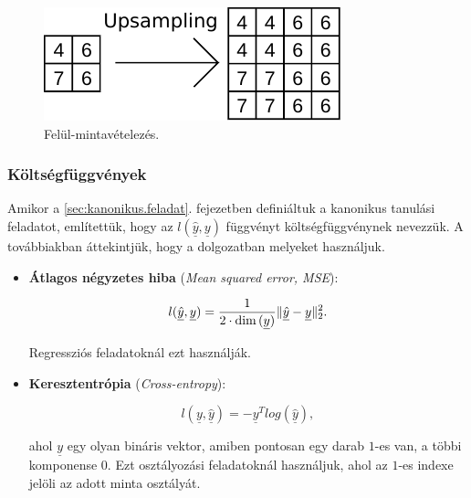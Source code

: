 \begin{figure} [h!]
	\centering
	\includegraphics[scale=1.2]{img/upsamping-pelda.pdf}
	\caption{Felül-mintavételezés.}
	\label{fig:upsampling-pelda}
\end{figure}




\subsubsection{Költségfüggvények}

Amikor a \ref{sec:kanonikus.feladat}. fejezetben definiáltuk a kanonikus tanulási feladatot, említettük, hogy az $ l(\underline{\hat{y}}, \underline{y}) $ függvényt költségfüggvénynek nevezzük. A továbbiakban áttekintjük, hogy a dolgozatban melyeket használjuk.

%

\begin{itemize}
	
	\item 
	\textbf{Átlagos négyzetes hiba} (\textit{Mean squared error, MSE}):
	
	
	\[  l(\underline{\hat{y}}, \underline{y}) = \frac{1}{2 \cdot \dim{(\underline{y})}} \lVert\underline{\hat{y}} - \underline{y}\rVert_2^2  . \]
	
	Regressziós feladatoknál ezt használják.

	
	\item 
	\textbf{Keresztentrópia} (\textit{Cross-entropy}):
	
	\[  l(\underline{y}, \underline{\hat{y}}) = - \underline{y}^T log(\underline{\hat{y}}) , \]
	
	ahol $ \underline{y} $ egy olyan bináris vektor, amiben pontosan egy darab $ 1 $-es van, a többi komponense $ 0 $. Ezt osztályozási feladatoknál használjuk, ahol az $ 1 $-es indexe jelöli az adott minta osztályát.
	
%	
%	
%
%	
	
	
\end{itemize}

